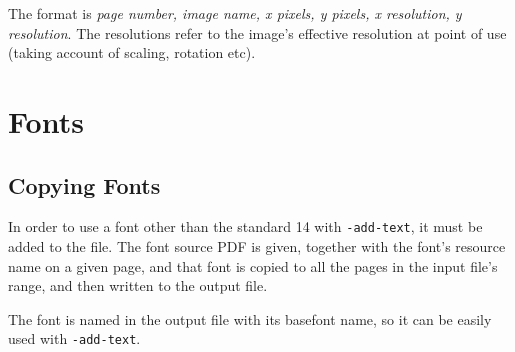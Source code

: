 \documentclass{book}
\begin{document}
\noindent{}

  \noindent The format is \textit{page number, image name, x pixels, y pixels, x resolution, y resolution}. The resolutions refer to the image's effective resolution at point of use (taking account of scaling, rotation etc).



\pagestyle{empty}

\chapter{Fonts}\pagestyle{fancy}

\noindent{}

\section{Copying Fonts}
\label{copyfont}

In order to use a font other than the standard 14 with \verb!-add-text!, it
must be added to the file. The font source PDF is given, together with the
font's resource name on a given page, and that font is copied to all the pages
in the input file's range, and then written to the output file.

The font is named in the output file with its basefont name, so it can be
easily used with \verb!-add-text!.
\end{document}
